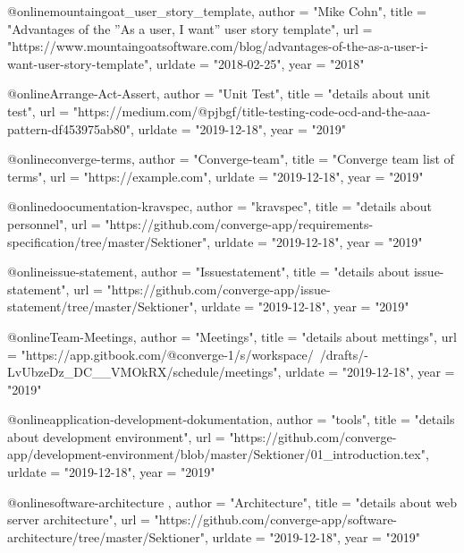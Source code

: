 
@online{mountaingoat_user_story_template,
    author = "Mike Cohn",
    title = "{Advantages of the ''As a user, I want'' user story template}",
    url = "https://www.mountaingoatsoftware.com/blog/advantages-of-the-as-a-user-i-want-user-story-template",
	urldate = "2018-02-25",
	year = "2018"
}

@online{Arrange-Act-Assert,
    author = "Unit Test",
    title = "{details about unit test}",
    url = "https://medium.com/@pjbgf/title-testing-code-ocd-and-the-aaa-pattern-df453975ab80",
	urldate = "2019-12-18",
    year = "2019"
}

@online{converge-terms,
    author = "Converge-team",
    title = "{Converge team list of terms}",
    url = "https://example.com",
    urldate = "2019-12-18",
    year = "2019"
}

@online{doocumentation-kravspec,
    author = "kravspec",
    title = "{details about personnel}",
    url = "https://github.com/converge-app/requirements-specification/tree/master/Sektioner",
    urldate = "2019-12-18",
    year = "2019"
}

@online{issue-statement,
    author = "Issuestatement",
    title = "{details about issue-statement}",
    url = "https://github.com/converge-app/issue-statement/tree/master/Sektioner",
    urldate = "2019-12-18",
    year = "2019"
}

@online{Team-Meetings,
    author = "Meetings",
    title = "{details about mettings}",
    url = "https://app.gitbook.com/@converge-1/s/workspace/~/drafts/-LvUbzeDz_DC__VMOkRX/schedule/meetings",
    urldate = "2019-12-18",
    year = "2019"
}

@online{application-development-dokumentation,
    author = "tools",
    title = "{details about development environment}",
    url = "https://github.com/converge-app/development-environment/blob/master/Sektioner/01_introduction.tex",
    urldate = "2019-12-18",
    year = "2019"
}

@online{software-architecture ,
    author = "Architecture",
    title = "{details about web server architecture}",
    url = "https://github.com/converge-app/software-architecture/tree/master/Sektioner",
    urldate = "2019-12-18",
    year = "2019"
}

